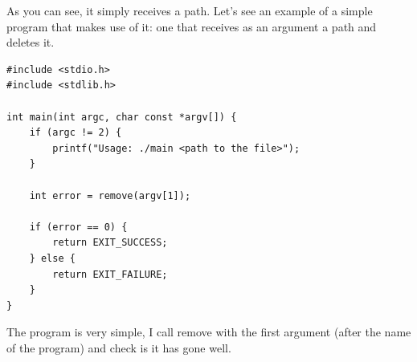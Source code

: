 \documentclass[a4paper]{article}
\begin{document}
As you can see, it simply receives a path. Let's see an example of a simple
program that makes use of it: one that receives as an argument a path and
deletes it.

\noindent
\begin{minipage}[H]{\linewidth}
\mbox{}
\begin{lstlisting}[style=C,
caption={Example of a program that uses \texttt{remove}},
label={lst:exampleRemove}]
#include <stdio.h>
#include <stdlib.h>

int main(int argc, char const *argv[]) {
    if (argc != 2) {
        printf("Usage: ./main <path to the file>");
    }

    int error = remove(argv[1]);

    if (error == 0) {
        return EXIT_SUCCESS;
    } else {
        return EXIT_FAILURE;
    }
}
\end{lstlisting}
\end{minipage}

The program is very simple, I call remove with the first
argument (after the name of the program) and check is it has gone well.
\end{document}
